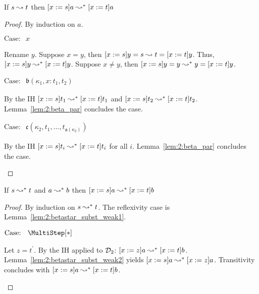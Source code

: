 \begin{lemma}
    If $s \leadsto t$ then $[x := s]a \leadsto^* [x := t]a$
    \label{lem:2:betastar_subst_weak2}
\end{lemma}
\begin{proof}
    By induction on $a$.

    $\text{Case: }\begin{array}{c} x \end{array}$
    \begin{proofcase}
        Rename $y$.
        Suppose $x = y$, then $[x := s]y = s \leadsto t = [x := t]y$.
        Thus, $[x := s]y \leadsto^* [x := t]y$.
        Suppose $x \neq y$, then $[x := s]y = y \leadsto^* y = [x := t]y$.
    \end{proofcase}

    $\text{Case: }\begin{array}{c} \mathfrak{b}(\kappa_1, x : t_1, t_2) \end{array}$
    \begin{proofcase}
        By the IH $[x := s]t_1 \leadsto^* [x := t]t_1$ and $[x := s]t_2 \leadsto^* [x := t]t_2$.
        Lemma~\ref{lem:2:beta_par} concludes the case.
    \end{proofcase}

    $\text{Case: }\begin{array}{c} \mathfrak{c}(\kappa_2, t_1, \ldots, t_{\mathfrak{a}(\kappa_2)}) \end{array}$
    \begin{proofcase}
        By the IH $[x := s]t_i \leadsto^* [x := t]t_i$ for all $i$.
        Lemma~\ref{lem:2:beta_par} concludes the case.
    \end{proofcase}
\end{proof}

\begin{lemma}
    If $s \leadsto^* t$ and $a \leadsto^* b$ then $[x := s]a \leadsto^* [x := t]b$
    \label{lem:2:betastar_subst}
\end{lemma}
\begin{proof}
    By induction on $s \leadsto^* t$.
    The reflexivity case is Lemma~\ref{lem:2:betastar_subst_weak1}.

    $\text{Case: }\begin{array}{c} \MultiStep[*] \end{array}$
    \begin{proofcase}
        Let $z = t^\prime$.
        By the IH applied to $\mathcal{D}_{2}$: $[x := z]a \leadsto^* [x := t]b$.
        Lemma~\ref{lem:2:betastar_subst_weak2} yields $[x := s]a \leadsto^* [x := z]a$.
        Transitivity concludes with $[x := s]a \leadsto^* [x := t]b$.
    \end{proofcase}
\end{proof}

